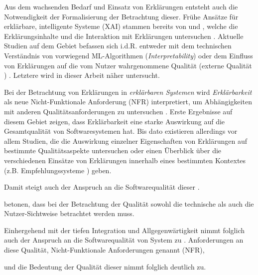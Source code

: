Aus dem wachsenden Bedarf und Einsatz von Erklärungen entsteht auch die Notwendigkeit der Formalisierung der Betrachtung dieser. Frühe Ansätze für erklärbare, intelligente Systeme (XAI) stammen bereits von \citeauthor{byrne1991construction} und \citeauthor{cawsey1991generating}, welche die Erklärungsinhalte \cite{byrne1991construction} und die Interaktion mit Erklärungen untersuchen \cite{cawsey1991generating}. Aktuelle Studien auf dem Gebiet befassen sich i.d.R. entweder mit dem technischen Verständnis von vorwiegend ML-Algorithmen (\textit{Interpretability}) \cite{gilpin_explaining_2018, fong_interpretable_2017, samek_towards_2019} oder dem Einfluss von Erklärungen auf die vom Nutzer wahrgenommene Qualität (externe Qualität \cite{international2011iso}) \cite{nunes_systematic_2017,kouki_user_2017,chazette_end-users_nodate}. Letztere wird in dieser Arbeit näher untersucht.

Bei der Betrachtung von Erklärungen in \textit{erklärbaren Systemen} wird \textit{Erklärbarkeit} als neue Nicht-Funktionale Anforderung (NFR) interpretiert, um Abhängigkeiten mit anderen Qualitätsanforderungen zu untersuchen \cite{kohl_explainability_2019, chazette2020explainability}. Erste Ergebnisse auf diesem Gebiet zeigen, dass Erklärbarkeit eine starke Auswirkung auf die Gesamtqualität von Softwaresystemen hat. Bis dato existieren allerdings vor allem Studien, die die Auswirkung einzelner Eigenschaften von Erklärungen auf bestimmte Qualitätsaspekte untersuchen oder einen Überblick über die verschiedenen Einsätze von Erklärungen innerhalb eines bestimmten Kontextes (z.B. Empfehlungssysteme \cite{nunes_systematic_2017}) geben.





\pagebreak

Damit steigt auch der Anspruch an die Softwarequalität dieser \cite{schneider2012abenteuer}. 


\citeauthor{ehsan_human-centered_2020} betonen, dass bei der Betrachtung der Qualität sowohl die technische als auch die Nutzer-Sichtweise betrachtet werden muss\cite{ehsan_human-centered_2020}. 

Einhergehend mit der tiefen Integration und Allgegenwärtigkeit nimmt folglich auch der Anspruch an die Softwarequalität von System zu \cite{schneider2012abenteuer}. Anforderungen an diese Qualität, \glqq Nicht-Funktionale Anforderungen genannt\grqq{} (NFR),

und die Bedeutung der Qualität dieser nimmt folglich deutlich zu. 

